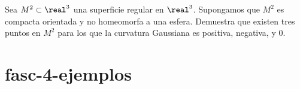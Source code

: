\begin{problem}[4]
 Sea $M^2 \subset \real^3$ una superficie regular en $\real^3$. Supongamos que $M^2$ es compacta orientada y no homeomorfa a una esfera. Demuestra que existen tres puntos en $M^2$ para los que la curvatura Gaussiana es positiva, negativa, y 0.
\solution




\end{problem}

\newpage
\section{fasc-4-ejemplos}

